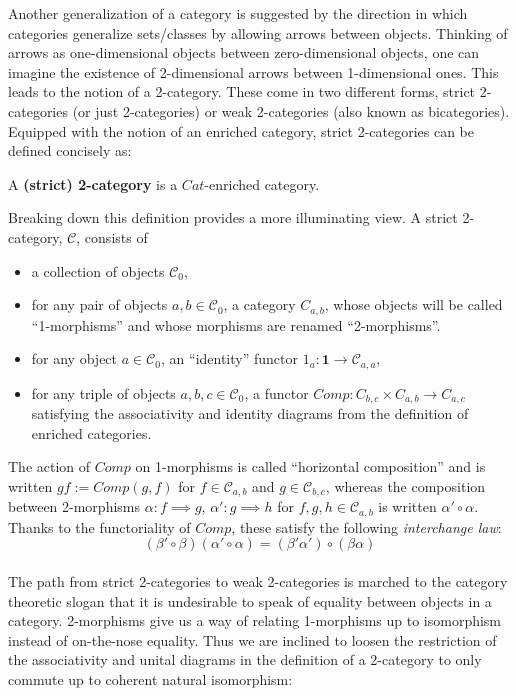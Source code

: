 Another generalization of a category is suggested by the direction in which categories generalize sets/classes by allowing arrows between objects. Thinking of arrows as one-dimensional objects between zero-dimensional objects, one can imagine the existence of 2-dimensional arrows between 1-dimensional ones. This leads to the notion of a 2-category. These come in two different forms, strict 2-categories (or just 2-categories) or weak 2-categories (also known as bicategories). Equipped with the notion of an enriched category, strict 2-categories can be defined concisely as:
\begin{defn}
  A \textbf{(strict) 2-category} is a $Cat$-enriched category.
\end{defn}
Breaking down this definition provides a more illuminating view. A strict 2-category, $\mathcal{C}$, consists of
\begin{itemize}
\item a collection of objects $\mathcal{C}_0$,
\item for any pair of objects $a, b \in \mathcal{C}_0$, a category $C_{a, b}$, whose objects will be called ``1-morphisms'' and whose morphisms are renamed ``2-morphisms''.
\item for any object $a \in \mathcal{C}_0$, an ``identity'' functor $1_a : \mathbf{1} \to \mathcal{C}_{a, a}$, 
\item for any triple of objects $a, b, c \in \mathcal{C}_0$, a functor $Comp : C_{b, c} \times C_{a, b} \to C_{a, c}$
  satisfying the associativity and identity diagrams from the definition of enriched categories.
\end{itemize}
The action of $Comp$ on 1-morphisms is called ``horizontal composition'' and is written $gf := Comp(g, f)$ for $f \in \mathcal{C}_{a, b}$ and $g \in \mathcal{C}_{b, c}$, whereas the composition between 2-morphisms $\alpha : f \implies g$, $\alpha' : g \implies h$ for $f, g, h \in \mathcal{C}_{a, b}$ is written $\alpha' \circ \alpha$.
Thanks to the functoriality of $Comp$, these satisfy the following \textit{interchange law}:
\[
  (\beta' \circ \beta)(\alpha'\circ \alpha)=(\beta'\alpha')\circ(\beta\alpha)
\]\\
The path from strict 2-categories to weak 2-categories is marched to the category theoretic slogan that it is undesirable to speak of equality between objects in a category. 2-morphisms give us a way of relating 1-morphisms up to isomorphism instead of on-the-nose equality. Thus we are inclined to loosen the restriction of the associativity and unital diagrams in the definition of a 2-category to only commute up to coherent natural isomorphism:
